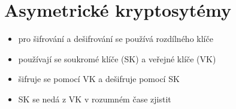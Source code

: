 \documentclass{szzclass}
\author{Jakub Rathouský}
\begin{document}
\tableofcontents
\newpage

\section{Asymetrické kryptosytémy}
\begin{itemize}
    \item pro šifrování a dešifrování se používá rozdílného klíče
    \item používají se soukromé klíče (SK) a veřejné klíče (VK)
    \item šifruje se pomocí VK a dešifruje pomocí SK
    \item SK se nedá z VK v rozumném čase zjistit
\end{itemize}
\end{document}
